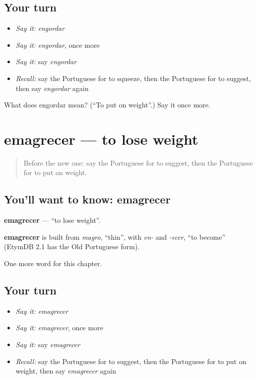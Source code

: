\subsection*{Your turn}
\begin{itemize}
\raggedright
  \item \emph{Say it:} \emph{engordar}
  \item \emph{Say it:} \emph{engordar}, once more
  \item \emph{Say it:} say \emph{engordar}
  \item \emph{Recall:} say the Portuguese for to squeeze, then the Portuguese for to suggest, then say \emph{engordar} again
\end{itemize}

\begin{tcolorbox}[breakable,colback=teal!4,colframe=teal!35!black,title={Before you move on}]
What does engordar mean? (\textquotedblleft{}To put on weight\textquotedblright{}.) Say it once more.
\end{tcolorbox}
\section[emagrecer]{emagrecer — to lose weight}

\label{lesson:PT-C239-emagrecer}



\begin{quote}
Before the new one: say the Portuguese for to suggest, then the Portuguese for to put on weight.
\end{quote}

\subsection*{You'll want to know: emagrecer}
\textbf{emagrecer} — \textquotedblleft{}to lose weight\textquotedblright{}.

\begin{cousinweb}
\textbf{emagrecer} is built from \emph{magro}, \textquotedblleft{}thin\textquotedblright{}, with \emph{en-} and \emph{-ecer}, \textquotedblleft{}to become\textquotedblright{} (EtymDB 2.1 has the Old Portuguese form).
\end{cousinweb}

\begin{grammarlens}[title={What you've built}]
One more word for this chapter.
\end{grammarlens}

\subsection*{Your turn}
\begin{itemize}
\raggedright
  \item \emph{Say it:} \emph{emagrecer}
  \item \emph{Say it:} \emph{emagrecer}, once more
  \item \emph{Say it:} say \emph{emagrecer}
  \item \emph{Recall:} say the Portuguese for to suggest, then the Portuguese for to put on weight, then say \emph{emagrecer} again
\end{itemize}


